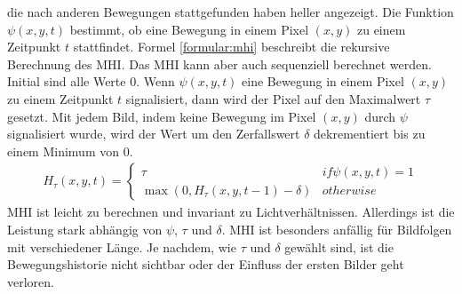 die nach anderen Bewegungen stattgefunden haben heller angezeigt. Die Funktion $\psi(x,y,t)$ bestimmt, ob eine Bewegung in einem Pixel $(x,y)$ zu einem Zeitpunkt $t$ stattfindet.
\newline
\newline
Formel \ref{formular:mhi} beschreibt die rekursive Berechnung des MHI. Das MHI kann aber auch sequenziell berechnet werden. Initial sind alle Werte 0. Wenn $\psi(x,y,t)$ eine Bewegung in einem Pixel $(x,y)$
zu einem Zeitpunkt $t$ signalisiert, dann wird der Pixel auf den Maximalwert $\tau$ gesetzt. Mit jedem Bild, indem keine Bewegung im Pixel $(x,y)$ durch $\psi$ signalisiert wurde, wird der Wert um den
Zerfallswert $\delta$ dekrementiert bis zu einem Minimum von 0.
\begin{align}
    H_{\tau}(x,y,t) = \begin{cases}
                          \tau & if \psi(x,y,t) = 1 \\
                          \max(0, H_{\tau}(x,y,t-1) - \delta) & otherwise
    \end{cases}
    \label{formular:mhi}
\end{align}
MHI ist leicht zu berechnen und invariant zu Lichtverhältnissen. Allerdings ist die Leistung stark abhängig von $\psi$, $\tau$ und $\delta$. MHI ist besonders anfällig für Bildfolgen mit verschiedener Länge.
Je nachdem, wie $\tau$ und $\delta$ gewählt sind, ist die Bewegungshistorie nicht sichtbar oder der Einfluss der ersten Bilder geht verloren.